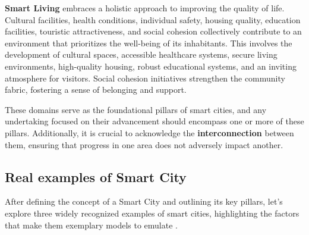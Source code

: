 \textbf{Smart Living} embraces a holistic approach to improving the quality of life. Cultural facilities, health conditions, individual safety, housing quality, education facilities, touristic attractiveness, and social cohesion collectively contribute to an environment that prioritizes the well-being of its inhabitants.
This involves the development of cultural spaces, accessible healthcare systems, secure living environments, high-quality housing, robust educational systems, and an inviting atmosphere for visitors. Social cohesion initiatives strengthen the community fabric, fostering a sense of belonging and support.


These domains serve as the foundational pillars of smart cities, and any undertaking focused on their advancement should encompass one or more of these pillars. Additionally, it is crucial to acknowledge the \textbf{interconnection} between them, ensuring that progress in one area does not adversely impact another. 

\subsection{Real examples of Smart City}
\label{subsec:ExamplesOfSmartCities}
After defining the concept of a Smart City and outlining its key pillars, let's explore three widely recognized examples of smart cities, highlighting the factors that make them exemplary models to emulate \cite{foo4}.


